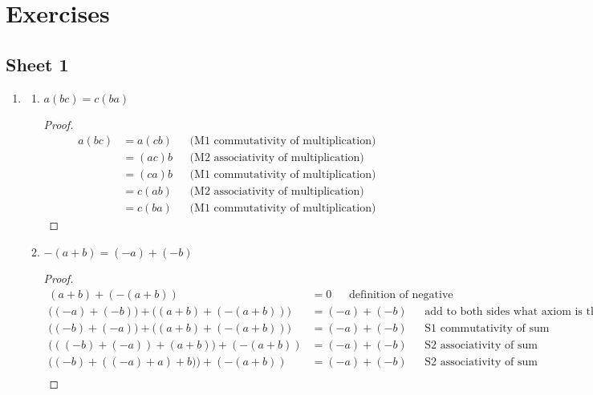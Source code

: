 \section{Exercises}

\subsection{Sheet 1}

\begin{enumerate}

\item
  \begin{enumerate}[label=(\alph*)]
  \item \begin{theorem*} $a(bc) = c(ba)$\end{theorem*}
    \begin{proof}
      \begin{align*}
        a(bc) &= a(cb)  ~~~~~~~ \text{(M1 commutativity of multiplication)}\\
              &= (ac)b  ~~~~~~~ \text{(M2 associativity of multiplication)}\\
              &= (ca)b  ~~~~~~~ \text{(M1 commutativity of multiplication)}\\
              &= c(ab)  ~~~~~~~ \text{(M2 associativity of multiplication)}\\
              &= c(ba)  ~~~~~~~ \text{(M1 commutativity of multiplication)}
      \end{align*}
    \end{proof}
  \item
    \begin{theorem*}
      $-(a + b) = (-a) + (-b)$
    \end{theorem*}
    \begin{proof}
      \begin{align*}
        (a + b) + (-(a + b))                   &= 0           ~~~~~~~ \text{definition of negative}\\
        \Big((-a) + (-b)\Big) + \Big((a + b) + (-(a + b))\Big) &= (-a) + (-b) ~~~~~~~ \text{add to both sides what axiom is this?}\\
        \Big((-b) + (-a)\Big) + \Big((a + b) + (-(a + b))\Big)   &= (-a) + (-b) ~~~~~~~ \text{S1 commutativity of sum}\\
        \Big(((-b) + (-a)) + (a + b)\Big) + (-(a + b))   &= (-a) + (-b) ~~~~~~~ \text{S2 associativity of sum}\\
        \Big((-b) + ((-a) + a) + b)\Big) + (-(a + b))    &= (-a) + (-b) ~~~~~~~ \text{S2 associativity of sum}\\

\end{align*}
\end{proof}
\end{enumerate}
\end{enumerate}
